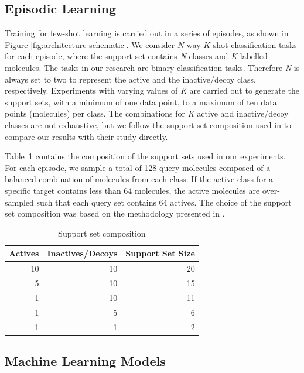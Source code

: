 \documentclass[journal=jcisd8,manuscript=article]{achemso} %
\begin{document}
\subsection{Episodic Learning}

Training for few-shot learning is carried out in a series of episodes, as shown in Figure \ref{fig:architecture-schematic}. We consider $N$-way $K$-shot classification tasks for each episode, where the support set contains \textit{N} classes and \textit{K} labelled molecules. The tasks in our research are binary classification tasks. Therefore \textit{N} is always set to two to represent the active and the inactive/decoy class, respectively. Experiments with varying values of \textit{K} are carried out to generate the support sets, with a minimum of one data point, to a maximum of ten data points (molecules) per class. The combinations for \textit{K} active and inactive/decoy classes are not exhaustive, but we follow the support set composition used in \citet{altae2017low} to compare our results with their study directly.

Table~\ref{table:support-set-sizes} contains the composition of the support sets used in our experiments. For each episode, we sample a total of 128 query molecules composed of a balanced combination of molecules from each class. If the active class for a specific target contains less than 64 molecules, the active molecules are over-sampled such that each query set contains 64 actives. The choice of the support set composition was based on the methodology presented in \citet{altae2017low}.

\begin{table}
    \centering
    \begin{tabular}{@{}rrr@{}}
        \hline
        Actives & Inactives/Decoys & Support Set Size \\
        \hline
        10  & 10 & 20 \\
        5   & 10 & 15 \\
        1   & 10 & 11 \\
        1   & 5  & 6 \\
        1   & 1  & 2 \\
        \hline
    \end{tabular}
    \caption{Support set composition}
    \label{table:support-set-sizes}
\end{table}

\subsection{Machine Learning Models}
\end{document}
